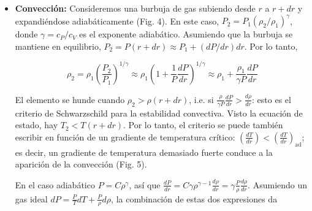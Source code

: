 \documentclass[11pt,letterpaper]{article}
\begin{document}
\begin{itemize}
        \begin{equation}
            L(r) = -4\pi r^2 \frac{4ac}{3\kappa(\rho, T)\rho(r)} T^3(r) \frac{dT}{dr} \quad \text{con } a = 4\sigma/c.
        \end{equation}

        Invirtiendo esta ecuación, las presiones del gas, \(P_{gas} = k \rho T / \mu m_H\), y de la radiación, \(P_{rad} = 4\sigma T_{eff}^4 / 3c\), se igualan cuando \(T = \left(\frac{3k}{\mu m_H} \frac{c}{4\sigma}\rho\right)^{1/3}\), para una relación \(\log T\)-\(\log \rho\) de pendiente \(1/3\). Visto que \(\rho \propto M_s/R_s^3\) y \(R_s \propto M_s^{0.6}\), se ve que \(P_{gas}\) es dominante en estrellas de masa baja, mientras \(P_{rad}\) domina el interior de estrellas de gran masa. Esto también implica que estrellas más masivas son también más calientes y menos densas.

        \item \textbf{Convección:} Consideremos una burbuja de gas subiendo desde \(r\) a \(r+dr\) y expandiéndose adiabáticamente (Fig. 4). En este caso, \(P_2 = P_1(\rho_2/\rho_1)^\gamma\), donde \(\gamma = c_P/c_V\) es el exponente adiabático. Asumiendo que la burbuja se mantiene en equilibrio, \(P_2 = P(r+dr) \approx P_1 + (dP/dr)dr\). Por lo tanto,

        \begin{equation}
            \rho_2 = \rho_1 \left( \frac{P_2}{P_1} \right)^{1/\gamma} \approx \rho_1 \left( 1 + \frac{1}{P} \frac{dP}{dr} \right)^{1/\gamma} \approx \rho_1 + \frac{\rho_1}{\gamma P} \frac{dP}{dr}
        \end{equation}

        El elemento se hunde cuando \(\rho_2 > \rho(r+dr)\), i.e. si \(\frac{\rho}{\gamma P} \frac{dP}{dr} > \frac{d\rho}{dr}\): esto es el criterio de Schwarzschild para la estabilidad convectiva. Visto la ecuación de estado, hay \(T_2 < T(r+dr)\). Por lo tanto, el criterio se puede también escribir en función de un gradiente de temperatura crítico: \(\left(\frac{dT}{dr}\right) < \left(\frac{dT}{dr}\right)_{\text{ad}}\); es decir, un gradiente de temperatura demasiado fuerte conduce a la aparición de la convección (Fig. 5).

        En el caso adiabático \(P = C \rho^\gamma\), así que \(\frac{dP}{dr} = C \gamma \rho^{\gamma - 1} \frac{d\rho}{dr} = \gamma \frac{P}{\rho} \frac{d\rho}{dr}\). Asumiendo un gas ideal \(dP = \frac{P}{T} dT + \frac{P}{\rho} d\rho\), la combinación de estas dos expresiones da


\end{itemize}
\end{document}
